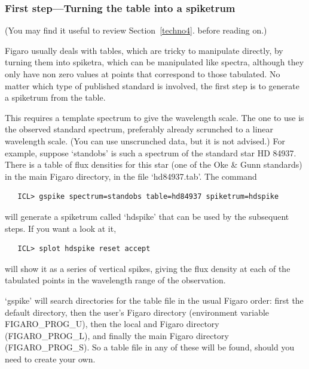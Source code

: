 \documentclass[11pt,twoside]{article}
\newcommand{\htmlref}[2]{#1}
\newcommand{\latorhtm}[2]{#1}
\newcommand{\latorhtm}[2]{#2}
\begin{document}

\subsubsection{\label{techno5first}First step\latorhtm{---}{-}Turning the
   table into a spiketrum}

   (You may find it useful to review
   \latorhtm{Section~\ref{techno4}.}
   {the section on \htmlref{spiketra}{techno4}}
   before reading on.)

   Figaro usually deals with tables, which are tricky to manipulate
   directly, by turning them into spiketra, which can be manipulated
   like spectra, although they only have non zero values at points that
   correspond to those tabulated.  No matter which type of published
   standard is involved, the first step is to generate a spiketrum from
   the table.

   This requires a template spectrum to give the wavelength scale.  The
   one to use is the observed standard spectrum, preferably already
   scrunched to a linear wavelength scale.  (You can use unscrunched
   data, but it is not advised.)  For example, suppose `standobs' is
   such a spectrum of the standard star HD 84937.  There is a table of
   flux densities for this star (one of the Oke \& Gunn standards) in
   the main Figaro directory, in the file `hd84937.tab'.  The command

\begin{verbatim}
   ICL> gspike spectrum=standobs table=hd84937 spiketrum=hdspike
\end{verbatim}

   will generate a spiketrum called `hdspike' that can be used by the
   subsequent steps.  If you want a look at it,

\begin{verbatim}
   ICL> splot hdspike reset accept
\end{verbatim}

   will show it as a series of vertical spikes, giving the flux density
   at each of the tabulated points in the wavelength range of the
   observation.

   `gspike' will search directories for the table file in the usual
   Figaro order: first the default directory, then the user's Figaro
   directory (environment variable FIGARO\_PROG\_U), then the local and
   Figaro directory (FIGARO\_PROG\_L), and finally the main Figaro
   directory (FIGARO\_PROG\_S).  So a table file in any of these will be
   found, should you need to create your own.
\end{document}

